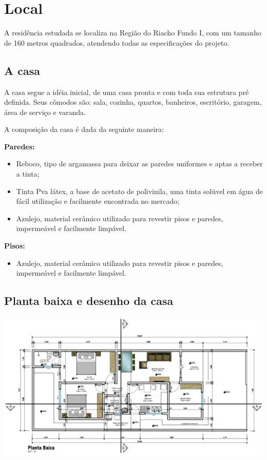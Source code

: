\section{Local}
A residência estudada se localiza na Região do Riacho Fundo I, com um tamanho de 160 metros quadrados, atendendo todas as especificações do projeto.

\subsection{A casa}
\par A casa segue a idéia inicial, de uma casa pronta e com toda sua estrutura pré definida. Seus cômodos são: sala, cozinha, quartos, banheiros, escritório, garagem, área de serviço e varanda.
\par A composição da casa é dada da seguinte maneira:
\par \textbf{Paredes:}
    \begin{itemize}
        \item Reboco, tipo de argamassa para deixar as paredes uniformes e aptas a receber a tinta;
        \item Tinta Pva látex, a base de acetato de polivinila, uma tinta solúvel em água de fácil utilização e facilmente encontrada no mercado;
        \item Azulejo, material cerâmico utilizado para revestir pisos e paredes, impermeável e facilmente limpável.
    \end{itemize}
\par \textbf{Pisos:}
    \begin{itemize}
        \item Azulejo, material cerâmico utilizado para revestir pisos e paredes, impermeável e facilmente limpável.
    \end{itemize}
\subsection{Planta baixa e desenho da casa}

\begin{center}
\includegraphics[width=\textwidth]{figuras/planta}
\end{center}

